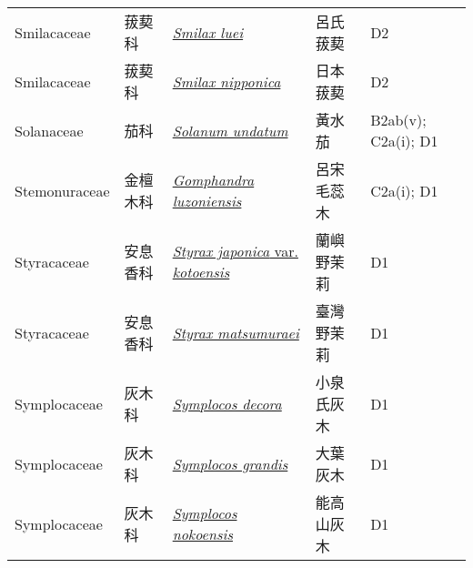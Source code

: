 {\begin{longtable}{L{2.5cm}L{2cm}L{5cm}L{2.5cm}L{3cm}}
    Smilacaceae & 菝葜科 & \href{http://www.theplantlist.org/tpl1.1/search?q=Smilax+luei}{\textit{Smilax luei} } & 呂氏菝葜 & D2    \\
    Smilacaceae & 菝葜科 & \href{http://www.theplantlist.org/tpl1.1/search?q=Smilax+nipponica}{\textit{Smilax nipponica} } & 日本菝葜 & D2    \\
    Solanaceae & 茄科 & \href{http://www.theplantlist.org/tpl1.1/search?q=Solanum+undatum}{\textit{Solanum undatum} } & 黃水茄 & B2ab(v); C2a(i); D1    \\
    Stemonuraceae & 金檀木科 & \href{http://www.theplantlist.org/tpl1.1/search?q=Gomphandra+luzoniensis}{\textit{Gomphandra luzoniensis} } & 呂宋毛蕊木 & C2a(i); D1    \\
    Styracaceae & 安息香科 & \href{http://www.theplantlist.org/tpl1.1/search?q=Styrax+japonica+var.+kotoensis}{\textit{Styrax japonica} var. \textit{kotoensis} } & 蘭嶼野茉莉 & D1    \\
    Styracaceae & 安息香科 & \href{http://www.theplantlist.org/tpl1.1/search?q=Styrax+matsumuraei}{\textit{Styrax matsumuraei} } & 臺灣野茉莉 & D1    \\
    Symplocaceae & 灰木科 & \href{http://www.theplantlist.org/tpl1.1/search?q=Symplocos+decora}{\textit{Symplocos decora} } & 小泉氏灰木 & D1    \\
    Symplocaceae & 灰木科 & \href{http://www.theplantlist.org/tpl1.1/search?q=Symplocos+grandis}{\textit{Symplocos grandis} } & 大葉灰木 & D1    \\
    Symplocaceae & 灰木科 & \href{http://www.theplantlist.org/tpl1.1/search?q=Symplocos+nokoensis}{\textit{Symplocos nokoensis} } & 能高山灰木 & D1    \\

\end{longtable}}
